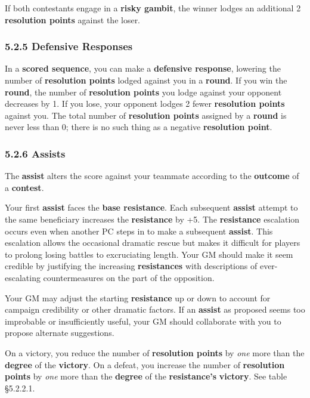 \documentclass[
  11pt,
]{article}
\begin{document}
If both contestants engage in a \textbf{risky gambit}, the winner lodges
an additional 2 \textbf{resolution points} against the loser.

\hypertarget{defensive-responses}{%
\subsubsection{5.2.5 Defensive Responses}\label{defensive-responses}}

In a \textbf{scored sequence}, you can make a \textbf{defensive
response}, lowering the number of \textbf{resolution points} lodged
against you in a \textbf{round}. If you win the \textbf{round}, the
number of \textbf{resolution points} you lodge against your opponent
decreases by 1. If you lose, your opponent lodges 2 fewer
\textbf{resolution points} against you. The total number of
\textbf{resolution points} assigned by a \textbf{round} is never less
than 0; there is no such thing as a negative \textbf{resolution point}.

\hypertarget{assists-1}{%
\subsubsection{5.2.6 Assists}\label{assists-1}}

The \textbf{assist} alters the score against your teammate according to
the \textbf{outcome} of a \textbf{contest}.

Your first \textbf{assist} faces the \textbf{base resistance}. Each
subsequent \textbf{assist} attempt to the same beneficiary increases the
\textbf{resistance} by +5. The \textbf{resistance} escalation occurs
even when another PC steps in to make a subsequent \textbf{assist}. This
escalation allows the occasional dramatic rescue but makes it difficult
for players to prolong losing battles to excruciating length. Your GM
should make it seem credible by justifying the increasing
\textbf{resistances} with descriptions of ever-escalating
countermeasures on the part of the opposition.

Your GM may adjust the starting \textbf{resistance} up or down to
account for campaign credibility or other dramatic factors. If an
\textbf{assist} as proposed seems too improbable or insufficiently
useful, your GM should collaborate with you to propose alternate
suggestions.

On a victory, you reduce the number of \textbf{resolution points} by
\emph{one} more than the \textbf{degree} of the \textbf{victory}. On a
defeat, you increase the number of \textbf{resolution points} by
\emph{one} more than the \textbf{degree} of the \textbf{resistance's}
\textbf{victory}. See table §5.2.2.1.
\end{document}
